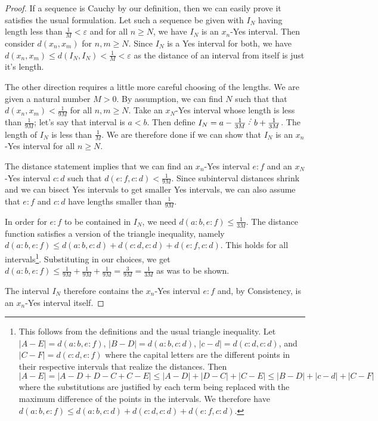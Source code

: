 \documentclass[12pt]{article}
\begin{document}
\begin{proof}
    
If a sequence is Cauchy by our definition, then we can easily prove it satisfies the usual formulation.  Let such a sequence be given with $I_N$ having length less than $\frac{1}{M} < \varepsilon$ and for all $n \geq N$, we have $I_N$ is an $x_n$-Yes interval. Then consider $d(x_n, x_m)$ for $n, m \geq N$. Since $I_N$ is a Yes interval for both, we have $d(x_n, x_m) \leq d(I_N, I_N) < \frac{1}{M} < \varepsilon$ as the distance of an interval from itself is just it's length. 

The other direction requires a little more careful choosing of the lengths. We are given a natural number $M>0$. By assumption, we can find $N$ such that that $d(x_n, x_m) < \frac{1}{9M}$ for all $n, m \geq N$. Take an $x_N$-Yes interval whose length is less than $\frac{1}{9M}$; let's say that interval is $a \lt b$. Then define $I_N = a-\frac{1}{3M} \lte b + \frac{1}{3M}$. The length of $I_N$ is less than $\frac{1}{M}$. We are therefore done if we can show that $I_N$ is an $x_n$-Yes interval for all $n \geq N$.

The distance statement implies that we can find an $x_n$-Yes interval $e:f$ and an $x_N$-Yes interval $c:d$ such that $d(e:f, c:d) < \frac{1}{9M}$. Since subinterval distances shrink and we can bisect Yes intervals to get smaller Yes intervals, we can also assume that $e:f$ and $c:d$ have lengths smaller than $\frac{1}{9M}$. 

In order for $e:f$ to be contained in $I_N$, we need $d(a:b, e:f) \leq \frac{1}{3M}$. The distance function satisfies a version of the triangle inequality, namely $d(a:b, e:f) \leq d(a:b, c:d) + d(c:d, c:d) + d(e:f, c:d)$. This holds for all intervals\footnote{This follows from the definitions and the usual triangle inequality. Let $|A-E| = d(a:b, e:f)$, $|B-D| = d(a:b, c:d)$, $|c-d| = d(c:d, c:d)$, and $|C-F| = d(c:d, e:f)$ where the capital letters are the different points in their respective intervals that realize the distances. Then $|A-E| = |A - D + D - C + C - E| \leq |A-D| + |D-C| + |C-E| \leq |B-D| + |c-d| + |C-F|$ where the substitutions are justified by each term being replaced with the maximum difference of the points in the intervals.  We therefore have $d(a:b, e:f) \leq d(a:b, c:d) + d(c:d, c:d) + d(e:f, c:d)$.}. Substituting in our choices, we get $ d(a:b, e:f)  \leq \frac{1}{9M} + \frac{1}{9M} + \frac{1}{9M} =  \frac{3}{9M} = \frac{1}{3M}$ as was to be shown. 

The interval $I_N$ therefore contains the $x_n$-Yes interval $e:f$ and, by Consistency, is an $x_n$-Yes interval itself. 

\end{proof}
\end{document}
